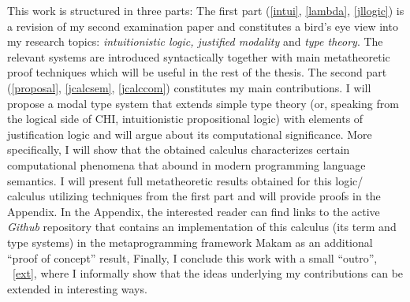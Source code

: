            This work  is structured in three parts: 
           The first part (\cref{intui}, \cref{lambda}, \cref{jllogic}) is a revision of my second examination paper and constitutes 
           a bird's eye view into my 
           research topics:  
           \emph{intuitionistic logic, justified modality} and \emph{type theory}. 
           The relevant systems are introduced syntactically together with main 
            metatheoretic proof techniques which will be useful 
           in the rest of the thesis.
           The second part (\cref{proposal}, \cref{jcalcsem}, \cref{jcalccom}) 
           constitutes my main contributions.
           I will propose  
           a modal type system that extends simple type theory
            (or, speaking from the logical side of \ac{CHI}, 
           intuitionistic propositional logic) with elements of
            justification logic and will argue about its computational significance. 
            More specifically, I will show  
           that the obtained calculus characterizes  certain 
           computational phenomena that abound in modern programming language semantics. 
           I will present full metatheoretic
           results obtained for this logic/ calculus utilizing techniques from the first part 
           and will provide proofs in the Appendix. 
           In the Appendix, the interested reader can find links to the active 
           \textit {Github} repository 
           that contains an implementation of  this calculus 
           (its term and type systems)
           in the metaprogramming framework {\sf Makam} 
           as an additional  ``proof of concept'' result,  
           Finally, I conclude this work with a small ``outro'', ~\cref{ext},
           where I informally show that the ideas underlying my contributions 
           can be extended in interesting ways.



